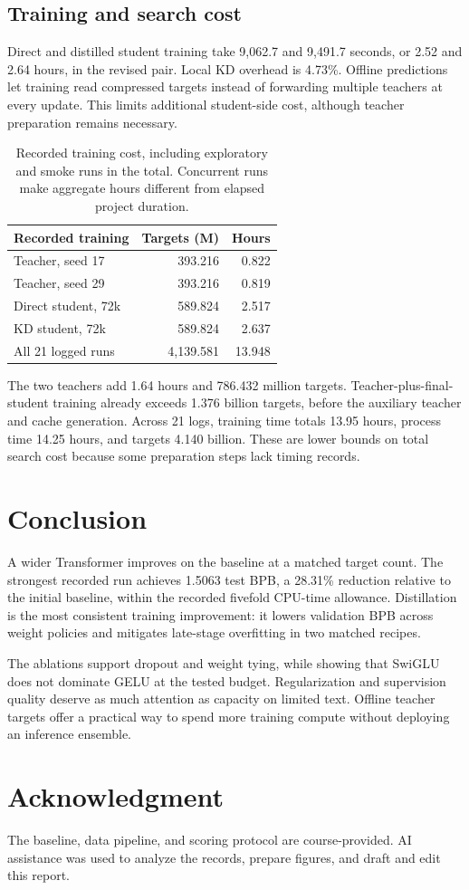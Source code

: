 \documentclass[10pt,twocolumn,letterpaper]{article}
\begin{document}
\subsection{Training and search cost}
Direct and distilled student training take 9,062.7 and 9,491.7 seconds,
or 2.52 and 2.64 hours, in the revised pair. Local KD overhead is 4.73\%.
Offline predictions let training read compressed targets instead of
forwarding multiple teachers at every update. This limits additional
student-side cost, although teacher preparation remains necessary.

\begin{table}[t]
\centering\small
\begin{tabular*}{\columnwidth}{@{\extracolsep{\fill}}lrr@{}}
\toprule
Recorded training & Targets (M) & Hours\\
\midrule
Teacher, seed 17 & 393.216 & 0.822\\
Teacher, seed 29 & 393.216 & 0.819\\
Direct student, 72k & 589.824 & 2.517\\
KD student, 72k & 589.824 & 2.637\\
\midrule
All 21 logged runs & 4,139.581 & 13.948\\
\bottomrule
\end{tabular*}
\caption{Recorded training cost, including exploratory and smoke runs
in the total. Concurrent runs make aggregate hours different from
elapsed project duration.}
\label{tab:cost}
\end{table}

The two teachers add 1.64 hours and 786.432 million targets.
Teacher-plus-final-student training already exceeds 1.376 billion targets,
before the auxiliary teacher and cache generation. Across 21 logs,
training time totals 13.95 hours, process time 14.25 hours, and targets
4.140 billion. These are lower bounds on total search cost because some
preparation steps lack timing records.

\section{Conclusion}
A wider Transformer improves on the baseline at a matched target count.
The strongest recorded run achieves 1.5063 test BPB, a 28.31\% reduction
relative to the initial baseline, within the recorded fivefold CPU-time
allowance. Distillation is the most consistent training improvement:
it lowers validation BPB across weight policies and mitigates late-stage
overfitting in two matched recipes.

The ablations support dropout and weight tying, while showing that
SwiGLU does not dominate GELU at the tested budget. Regularization and
supervision quality deserve as much attention as capacity on limited
text. Offline teacher targets offer a practical way to spend more
training compute without deploying an inference ensemble.

\section*{Acknowledgment}
The baseline, data pipeline, and scoring protocol are course-provided.
AI assistance was used to analyze the records, prepare figures, and
draft and edit this report.
\end{document}
